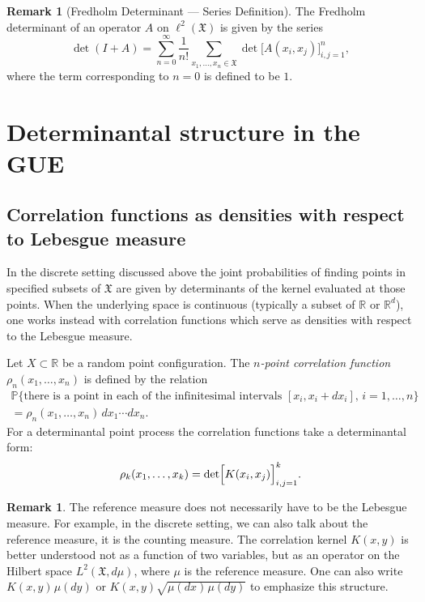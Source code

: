 \documentclass[letterpaper,11pt,oneside,reqno]{article}
\numberwithin{equation}{section}
\newcommand{\ssp}{\hspace{1pt}}
\theoremstyle{definition}
\newtheorem{remark}[proposition]{Remark}
\begin{document}
\begin{remark}[Fredholm Determinant --- Series Definition]
	The Fredholm determinant of an operator $A$ on $\ell^2(\mathfrak{X})$ is given by the series
	\[
	\det(I+A)=\sum_{n=0}^\infty \frac{1}{n!}\sum_{x_1,\dots,x_n\in\mathfrak{X}} \det\bigl[A(x_i,x_j)\bigr]_{i,j=1}^n,
	\]
	where the term corresponding to $n=0$ is defined to be $1$.
\end{remark}


\section{Determinantal structure in the GUE}
\label{sec:gue-dpp}

\subsection{Correlation functions as densities with respect to Lebesgue measure}
\label{sec:corr-functions-lebesgue}

In the discrete setting discussed above the joint probabilities of finding points in specified subsets of $\mathfrak{X}$ are given by determinants of the kernel evaluated at those points. When the underlying space is continuous (typically a subset of $\mathbb{R}$ or $\mathbb{R}^d$), one works instead with correlation functions which serve as densities with respect to the Lebesgue measure.

Let $X\subset \mathbb{R}$ be a random point configuration. The \emph{$n$-point correlation function} $\rho_n(x_1,\dots,x_n)$ is defined by the relation
\begin{multline*}
\mathbb{P}\{\text{there is a point in each of the infinitesimal intervals } [x_i, x_i+dx_i], \, i=1,\dots,n\}
\\
=\rho_n(x_1,\dots,x_n)\,dx_1\cdots dx_n.
\end{multline*}
For a determinantal point process the correlation functions take a determinantal form:
\[
\rho_k(x_1,\dots,x_k)=\det\Bigl[K(x_i,x_j)\Bigr]_{i,j=1}^k.
\]
\begin{remark}
	The reference measure does not necessarily have to be the Lebesgue measure.
	For example, in the discrete setting, we can also talk about the
	reference measure, it is the counting measure.
	The correlation kernel $K(x,y)$ is better understood not as a function of two variables, but as an operator on the Hilbert space
	$L^2(\mathfrak{X},d\mu)$, where $\mu$ is the reference measure.
	One can also write $K(x,y)\ssp\mu(dy)$ or $K(x,y)\sqrt{\mu(dx)\ssp \mu(dy)}$ to emphasize this structure.
\end{remark}
\end{document}
